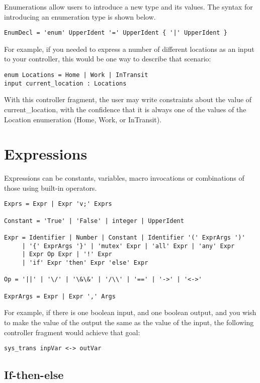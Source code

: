Enumerations allow users to introduce a new type and its values. The syntax for introducing an enumeration type is shown below.
\begin{lstlisting}
EnumDecl = 'enum' UpperIdent '=' UpperIdent { '|' UpperIdent }
\end{lstlisting}
For example, if you needed to express a number of different locations as an input to your controller, this would be one way to describe that scenario:
\begin{lstlisting}
enum Locations = Home | Work | InTransit
input current_location : Locations
\end{lstlisting}
With this controller fragment, the user may write constraints about the value of current\_location, with the confidence that it is always one of the values of the Location enumeration (Home, Work, or InTransit).

\section{Expressions}

Expressions can be constants, variables, macro invocations or combinations of those using built-in operators.
\begin{lstlisting}
Exprs = Expr | Expr 'v;' Exprs

Constant = 'True' | 'False' | integer | UpperIdent

Expr = Identifier | Number | Constant | Identifier '(' ExprArgs ')'
     | '{' ExprArgs '}' | 'mutex' Expr | 'all' Expr | 'any' Expr
     | Expr Op Expr | '!' Expr
     | 'if' Expr 'then' Expr 'else' Expr

Op = '||' | '\/' | '\&\&' | '/\\' | '==' | '->' | '<->'

ExprArgs = Expr | Expr ',' Args
\end{lstlisting}

For example, if there is one boolean input, and one boolean output, and you wish to make the value of the output the same as the value of the input, the following controller fragment would achieve that goal:

\begin{lstlisting}
sys_trans inpVar <-> outVar
\end{lstlisting}

\subsection{If-then-else}

